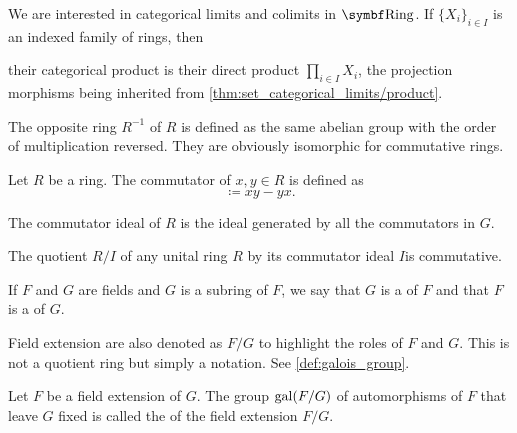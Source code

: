 \begin{proposition}\label{thm:ring_categorical_limits}
  We are interested in categorical limits and colimits in \( \Cat{Ring} \). If \( \{ X_i \}_{i \in I} \) is an indexed family of rings, then
  \begin{defenum}
     their categorical product is their direct product \( \prod_{i \in I} X_i \), the projection morphisms being inherited from \cref{thm:set_categorical_limits/product}.
  \end{defenum}
\end{proposition}

\begin{definition}\label{def:opposite_ring}\cite[555]{Knapp2016BAlg}
  The opposite ring \( R^{-1} \) of \( R \) is defined as the same abelian group with the order of multiplication reversed. They are obviously isomorphic for commutative rings.
\end{definition}

\begin{definition}\label{def:ring_commutator}
  Let \( R \) be a ring. The commutator of \( x, y \in R \) is defined as
  \begin{equation*}
    [x, y] \coloneqq xy - yx.
  \end{equation*}

  The commutator ideal of \( R \) is the ideal generated by all the commutators in \( G \).
\end{definition}

\begin{proposition}\label{thm:quotient_by_commutator_ideal}
  The quotient \( R / I \) of any unital ring \( R \) by its commutator ideal \( I \)is commutative.
\end{proposition}

\begin{definition}\label{def:field_extension}
  If \( F \) and \( G \) are fields and \( G \) is a subring of \( F \), we say that \( G \) is a  of \( F \) and that \( F \) is a  of \( G \).

  Field extension are also denoted as \( F / G \) to highlight the roles of \( F \) and \( G \). This is not a quotient ring but simply a notation. See \cref{def:galois_group}.
\end{definition}

\begin{definition}\label{def:galois_group}\cite[124]{Knapp2016BAlg}
  Let \( F \) be a field extension of \( G \). The group \( \operatorname{gal}(F / G) \) of automorphisms of \( F \) that leave \( G \) fixed is called the  of the field extension \( F / G \).
\end{definition}
